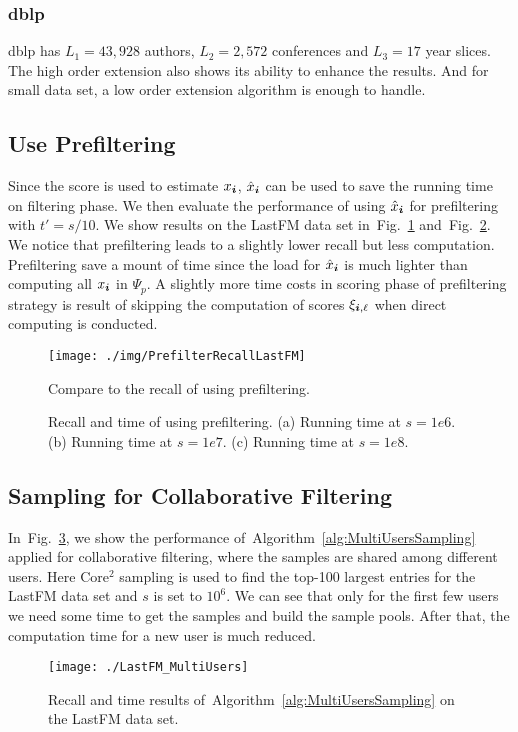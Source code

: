 \documentclass[10pt,journal,compsoc]{IEEEtran}
\newcommand{\score}[1]{\xi_{\V{i},#1}}
\newcommand{\V}[1]{{\boldsymbol{{\MakeLowercase{#1}}}}}
\newcommand{\predx}{\hat{x}_{\V{i}}}
\newcommand{\Fig}[1]{Fig.~\ref{fig:#1}}
\newcommand{\Alg}[1]{Algorithm~\ref{alg:#1}}
\begin{document}
\subsubsection{dblp}

dblp has $L_1 = 43,928$ authors, $L_2 = 2,572$ conferences and $L_3 = 17$ year slices. The high order extension also shows its ability to enhance the results. And for small data set, a low order extension algorithm is enough to handle.

\subsection{Use Prefiltering}
Since the score is used to estimate $x_\V{i}$, $\predx$ can be used to save the running time on filtering phase. We then evaluate the performance of using $\predx$ for prefiltering with $t'=s/10$. We show results on the LastFM data set in~\Fig{PrefilterRecallLastFM} and~\Fig{PrefilterTimeLastFM}. We notice that prefiltering leads to a slightly lower recall but less computation. Prefiltering save a mount of time since the load for $\predx$ is much lighter than computing all $x_\V{i}$ in $\Psi_p$. A slightly more time costs in scoring phase of prefiltering strategy is result of skipping the computation of scores $\score{\ell}$ when direct computing is conducted.

\begin{figure}[!ht]
	\centering
	\texttt{[image: ./img/PrefilterRecallLastFM]}
	\caption{Compare to the recall of using prefiltering.}
	\label{fig:PrefilterRecallLastFM}
\end{figure}
\begin{figure}[!ht]
	\centering
	\qquad
	\qquad
	\caption{Recall and time of using prefiltering.
		(a) Running time at $s=1e6$. (b) Running time at $s=1e7$. (c) Running time at $s=1e8$.}
	\label{fig:PrefilterTimeLastFM}
\end{figure}

\subsection{Sampling for Collaborative Filtering}

In~\Fig{MutilUsers}, we show the performance of~\Alg{MultiUsersSampling} applied for collaborative filtering, where the samples are shared among different users. Here Core$^2$ sampling is used to find the top-100 largest entries for the LastFM data set and $s$ is set to $10^6$. We can see that only for the first few users we need some time to get the samples and build the sample pools. After that, the computation time for a new user is much reduced.
\begin{figure}[!ht]
	\centering
	\texttt{[image: ./LastFM\_MultiUsers]}\\
	\caption{Recall and time results of~\Alg{MultiUsersSampling} on the LastFM data set.}
	\label{fig:MutilUsers}
\end{figure}
\end{document}
